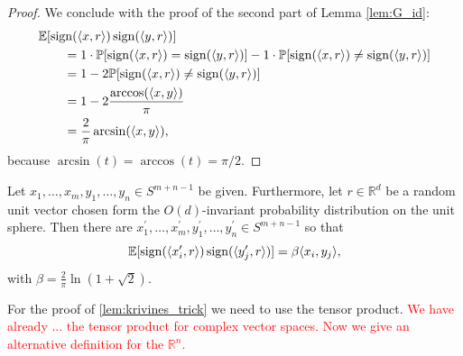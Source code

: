 \begin{proof}
	\noindent We conclude with the proof of the second part of Lemma \ref{lem:G_id}: 
	\begin{align*}
		&\mathbb{E}[\operatorname{sign}(\langle{x},{r}\rangle) \operatorname{sign}(\langle{y},{r}\rangle)] \\
		&\qquad= 1\cdot\mathbb{P}[\operatorname{sign}(\langle{x},{r}\rangle) = \operatorname{sign} (\langle{y},{r}\rangle )] - 1\cdot \mathbb{P}[\operatorname{sign}(\langle{x},{r}\rangle) \neq \operatorname{sign}(\langle{y},{r}\rangle)] \\
		&\qquad= 1 - 2\mathbb{P}[\operatorname{sign}(\langle{x},{r}\rangle) \neq \operatorname{sign}(\langle{y},{r}\rangle)] \\
		&\qquad= 1 - 2 \frac{\arccos(\langle{x},{y}\rangle)}{\pi} \\
		&\qquad= \frac{2}{\pi} \arcsin(\langle{x},{y}\rangle),
	\end{align*}
	because $\arcsin (t) = \arccos(t) = \pi/2$.
\end{proof}

\begin{lemma}\label{lem:krivines_trick}
	Let $x_1,\dots,x_m,y_1,\dots,y_n\in S^{m+n-1}$ be given. Furthermore, let $r\in\mathbb{R}^d$ be a random unit vector chosen form the $O(d)$-invariant probability distribution on the unit sphere. Then there are $x_1^\prime,\dots,x_m^\prime, y_1^\prime,\dots,y_n^\prime\in S^{m+n-1}$ so that
	\begin{equation}
		\mathbb{E}[\operatorname{sign}(\langle{x_i^\prime},{r}\rangle)\operatorname{sign}(\langle{y_j^\prime},{r}\rangle)] = \beta \langle{x_i},{y_j}\rangle,
		\label{eq:krivines_trick}
	\end{equation}		
	with $\beta = \frac{2}{\pi} \ln (1+\sqrt{2}).$
\end{lemma}

\noindent For the proof of \ref{lem:krivines_trick} we need to use the tensor product. \textcolor{red}{We have already ... the tensor product for complex vector spaces. Now we give an alternative definition for the $\mathbb{R}^n$.} 

